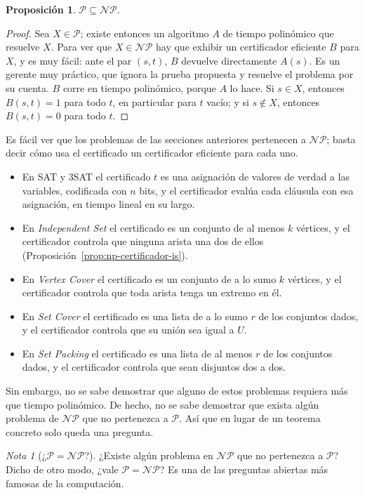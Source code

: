\documentclass[12pt, spanish, oneside, openany]{book}
\newcommand{\clP}{\mathcal{P}}
\newcommand{\NP}{\mathcal{NP}}
\newcommand{\prob}[1]{\textit{#1}}
\newcommand{\IS}{\prob{Independent Set}\xspace}
\newcommand{\VC}{\prob{Vertex Cover}\xspace}
\newcommand{\SC}{\prob{Set Cover}\xspace}
\newcommand{\SP}{\prob{Set Packing}\xspace}
\theoremstyle{uprightplain}
\newtheorem{proposicion}[teorema]{Proposición}
\theoremstyle{definition}
\theoremstyle{remark}
\newtheorem{nota}[teorema]{Nota}
\theoremstyle{definition}
\begin{document}
\begin{proposicion}
\label{prop:np-p-en-np}
$\clP\subseteq\NP$.
\end{proposicion}
\begin{proof}
Sea $X\in\clP$; existe entonces un algoritmo $A$ de tiempo polinómico que resuelve $X$. Para ver que $X\in\NP$ hay que exhibir un certificador eficiente $B$ para $X$, y es muy fácil: ante el par $(s,t)$, $B$ devuelve directamente $A(s)$. Es un gerente muy práctico, que ignora la prueba propuesta y resuelve el problema por su cuenta. $B$ corre en tiempo polinómico, porque $A$ lo hace. Si $s\in X$, entonces $B(s,t)=1$ para todo $t$, en particular para $t$ vacío; y si $s\notin X$, entonces $B(s,t)=0$ para todo $t$.
\end{proof}

Es fácil ver que los problemas de las secciones anteriores pertenecen a $\NP$; basta decir cómo usa el certificado un certificador eficiente para cada uno.
\begin{itemize}
    \item En SAT y 3SAT el certificado $t$ es una asignación de valores de verdad a las variables, codificada con $n$ bits, y el certificador evalúa cada cláusula con esa asignación, en tiempo lineal en su largo.
    \item En \IS el certificado es un conjunto de al menos $k$ vértices, y el certificador controla que ninguna arista una dos de ellos (Proposición~\ref{prop:np-certificador-is}).
    \item En \VC el certificado es un conjunto de a lo sumo $k$ vértices, y el certificador controla que toda arista tenga un extremo en él.
    \item En \SC el certificado es una lista de a lo sumo $r$ de los conjuntos dados, y el certificador controla que su unión sea igual a $U$.
    \item En \SP el certificado es una lista de al menos $r$ de los conjuntos dados, y el certificador controla que sean disjuntos dos a dos.
\end{itemize}

Sin embargo, no se sabe demostrar que alguno de estos problemas requiera más que tiempo polinómico. De hecho, no se sabe demostrar que exista algún problema de $\NP$ que no pertenezca a $\clP$. Así que en lugar de un teorema concreto solo queda una pregunta.

\begin{nota}[¿$\clP=\NP$?]
\label{nota:np-p-np}
¿Existe algún problema en $\NP$ que no pertenezca a $\clP$? Dicho de otro modo, ¿vale $\clP=\NP$? Es una de las preguntas abiertas más famosas de la computación.
\end{nota}
\end{document}
